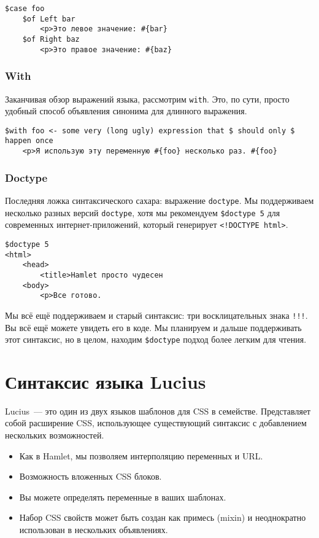 \begin{lstlisting}
$case foo
    $of Left bar
        <p>Это левое значение: #{bar}
    $of Right baz
        <p>Это правое значение: #{baz}
\end{lstlisting}

\subsubsection{With}

Заканчивая обзор выражений языка, рассмотрим \lstinline'with'. Это, по сути,
просто удобный способ объявления синонима для длинного выражения.

\begin{lstlisting}
$with foo <- some very (long ugly) expression that $ should only $ happen once
    <p>Я использую эту переменную #{foo} несколько раз. #{foo}
\end{lstlisting}

\subsubsection{Doctype}
Последняя ложка синтаксического сахара: выражение \lstinline'doctype'. Мы
поддерживаем несколько разных версий \lstinline'doctype', хотя мы рекомендуем
\lstinline'$doctype 5' для современных интернет-приложений, который генерирует
\lstinline'<!DOCTYPE html>'.

\begin{lstlisting}
$doctype 5
<html>
    <head>
        <title>Hamlet просто чудесен
    <body>
        <p>Все готово.
\end{lstlisting}

\begin{remark}
    Мы всё ещё поддерживаем и старый синтаксис: три восклицательных знака
    \lstinline'!!!'.  Вы всё ещё можете увидеть его в коде. Мы планируем и дальше
    поддерживать этот синтаксис, но в целом, находим \lstinline'$doctype'
    подход более легким для чтения.
\end{remark}

\section{Синтаксис языка Lucius}

Lucius~--- это один из двух языков шаблонов для CSS в семействе. Представляет
собой расширение CSS, использующее существующий синтаксис с добавлением
нескольких возможностей.

\begin{itemize}
    \item Как в Hamlet, мы позволяем интерполяцию переменных и URL.
    \item Возможность вложенных CSS блоков.
    \item Вы можете определять переменные в ваших шаблонах.
    \item Набор CSS свойств может быть создан как примесь (mixin) и
        неоднократно использован в нескольких объявлениях.
\end{itemize}

